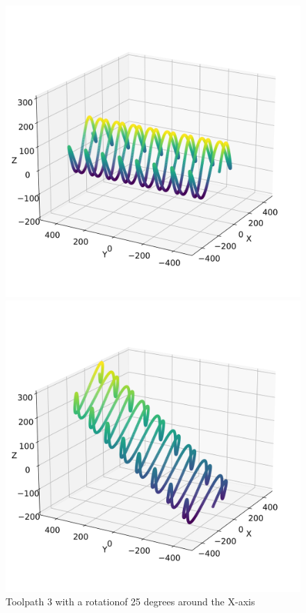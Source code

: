 \begin{figure}[H]%
	\centering
	\begin{minipage}{0.5\textwidth}
		\includegraphics[width=\textwidth]{figures/path3_kipp_0.png}
		\caption{Toolpath 3 with no rotation\newline around the X-axis}
		\label{TP3_0}
	\end{minipage}\hfill
	\begin{minipage}{0.5\textwidth}
		\includegraphics[width=\textwidth]{figures/path3_kipp_25_comparison.png}
		\caption{Toolpath 3 with a rotation\newline of 25 degrees around the X-axis}
		\label{TP3_25}
	\end{minipage}\par
\end{figure}
 


